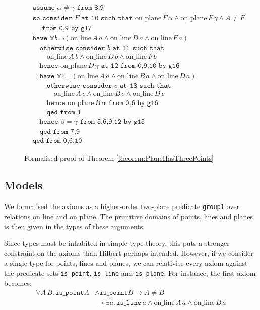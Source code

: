 \documentclass{article}
\newcommand{\online}[2]{\text{on\_line}\,#1\,#2}
\newcommand{\onplane}[2]{\text{on\_plane}\,#1\,#2}
\newcommand{\Triangle}[4]{\forall #1.\neg(\online{#2}{a}\wedge \online{#3}{a}\wedge \online{#4}{a})}
\renewcommand{\implies}{\longrightarrow}
\begin{document}
\begin{figure}
\begin{align*}
&\texttt{assume } \alpha\neq\gamma \texttt{ from 8,9}\\
&\texttt{so consider } F \texttt{ at 10 such that }\onplane{F}{\alpha}\wedge \onplane{F}{\gamma}\wedge A \neq F \\
&\quad\texttt{ from 0,9 by g17}\\
&\texttt{have }\Triangle{b}{A}{D}{F}\\
&\quad\texttt{otherwise consider } b \texttt{ at 11 such that }\\
&\quad\quad\online{A}{b}\wedge \online{D}{b}\wedge \online{F}{b}\\
&\quad\texttt{hence }\onplane{D}{\gamma}\texttt{ at 12 from 0,9,10 by g16}\\
&\quad\texttt{have }\Triangle{c}{A}{B}{D}\\
&\quad\quad\texttt{otherwise consider } c \texttt{ at 13 such that }\\
&\quad\quad\quad\online{A}{c}\wedge \online{B}{c}\wedge \online{D}{c}\\
&\quad\quad\texttt{hence }\onplane{B}{\alpha}\texttt{ from 0,6 by g16}\\
&\quad\quad\texttt{qed from 1}\\
&\quad\texttt{hence }\beta=\gamma \texttt{ from 5,6,9,12 by g15}\\
&\quad\texttt{qed from 7,9}\\
&\texttt{qed from 0,6,10}
\end{align*}
\caption{Formalised proof of Theorem \ref{theorem:PlaneHasThreePoints}}
\label{fig:PlaneHasThreePoints}
\end{figure}

\subsection{Models}
We formalised the axioms as a higher-order two-place predicate \texttt{group1} over relations $\text{on\_line}$ and $\text{on\_plane}$. The primitive domains of points, lines and planes is then given in the types of these arguments.

Since types must be inhabited in simple type theory, this puts a stronger constraint on the axioms than Hilbert perhaps intended. However, if we consider a single type for points, lines and planes, we can relativise every axiom against the predicate sets \texttt{is\_point}, \texttt{is\_line} and \texttt{is\_plane}. For instance, the first axiom becomes:
\begin{align*}
\forall A\, B.\, \texttt{is\_point} A &\wedge  \texttt{is\_point} B \implies A \neq B\\
&\implies \exists a.\, \texttt{is\_line}\,a \wedge \online{A}{a} \wedge \online{B}{a}
\end{align*}
\end{document}
